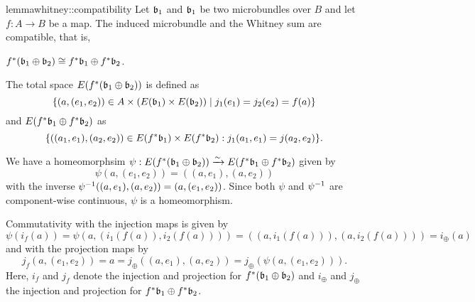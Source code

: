 \begin{scope}
    \newcommand{\wleft} {%
        \ind{f} (\whitney{\bb_1}{\bb_2})%
    }
    \newcommand{\wright} {%
        \whitney{\ind{f}\bb_1}{\ind{f}\bb_2}%
    }

    \begin{mystatement}{lemma}{whitney::compatibility}
        Let $\bb_1$ and $\bb_1$ be two microbundles over $B$ and let $f: A \to B$ be a map.
        The induced microbundle and the Whitney sum are compatible, that is,
        \begin{center}
            $\wleft \cong \wright$.
        \end{center}
    \end{mystatement}

    \begin{myproof}
        The total space $E(\wleft)$ is defined as
        \[ \{(a, (e_1, e_2)) \in A \cross (E(\bb_1) \cross E(\bb_2)) \mid j_1(e_1) = j_2(e_2) = f(a) \} \]
        and $E(\wright)$ as
        \[ \set{((a_1, e_1), (a_2, e_2)) \in E(\ind{f}\bb_1) \cross E(\ind{f}\bb_2)}{j_1(a_1, e_1) = j(a_2, e_2)}. \]

        We have a homeomorphsim $\psi: E(\wleft) \isomto E(\wright)$ given by
        \[ \psi(a, (e_1, e_2)) = ((a, e_1), (a, e_2)) \]
        with the inverse $\psi^{-1}((a, e_1), (a, e_2)) = (a, (e_1, e_2))$.
        Since both $\psi$ and $\psi^{-1}$ are component-wise continuous,
        $\psi$ is a homeomorphism.
        
        Commutativity with the injection maps is given by
        \[ \psi(i_f(a)) = \psi(a, (i_1(f(a)), i_2(f(a)))) = ((a, i_1(f(a))), (a, i_2(f(a)))) = i_\oplus(a) \]
        and with the projection maps by
        \[ j_f(a, (e_1, e_2)) = a = j_\oplus((a, e_1), (a, e_2)) = j_\oplus(\psi(a, (e_1, e_2))). \]
        Here, $i_f$ and $j_f$ denote the injection and projection for $\wleft$
        and $i_\oplus$ and $j_\oplus$ the injection and projection for $\wright$.
    \end{myproof}
\end{scope}